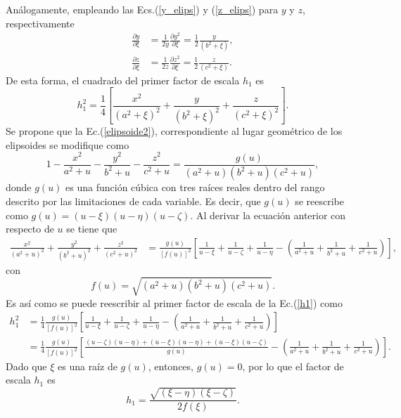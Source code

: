 Análogamente, empleando las Ecs.(\ref{y_elips}) y (\ref{z_elips}) para $y$ y $z$, respectivamente
\begin{align*}
	\frac{\partial y}{\partial \xi}&=\frac{1}{2y}\frac{\partial y^2}{\partial\xi}=\frac{1}{2}\frac{y}{(b^2+\xi)},\\
	\frac{\partial z}{\partial \xi}&=\frac{1}{2z}\frac{\partial z^2}{\partial\xi}=\frac{1}{2}\frac{z}{(c^2+\xi)}.
\end{align*}
De esta forma, el cuadrado del primer factor de escala $h_1$ es
\begin{equation}
	h_1^2=\frac{1}{4}\left[\frac{x^2}{(a^2+\xi)^2}+\frac{y}{(b^2+\xi)^2}+\frac{z}{(c^2+\xi)^2}\right].
	\label{h1}
\end{equation}
Se propone que la Ec.(\ref{elipsoide2}), correspondiente al lugar geométrico de los elipsoides se modifique como
\begin{equation}
	1-\frac{x^2}{a^2+u}-\frac{y^2}{b^2+u}-\frac{z^2}{c^2+u}=\frac{g(u)}{(a^2+u)(b^2+u)(c^2+u)},
\end{equation}
donde $g(u)$ es una función cúbica con tres raíces reales dentro del rango descrito por las limitaciones de cada variable. Es decir, que $g(u)$ se reescribe como $g(u)=(u-\xi)(u-\eta)(u-\zeta)$. Al derivar la ecuación anterior con respecto de $u$ se tiene que
\begin{align}
	\frac{x^2}{(a^2+u)^2}+\frac{y^2}{(b^2+u)^2}+\frac{z^2}{(c^2+u)^2}&=\frac{g(u)}{[f(u)]^2}\left[\frac{1}{u-\xi}+\frac{1}{u-\zeta}+\frac{1}{u-\eta}-\left(\frac{1}{a^2+u}+\frac{1}{b^2+u}+\frac{1}{c^2+u}\right)\right],
\end{align}
con 
\begin{equation}
	f(u)=\sqrt{(a^2+u)(b^2+u)(c^2+u)}.    
\end{equation}
Es así como se puede reescribir al primer factor de escala de la Ec.(\ref{h1}) como
\begin{align*}
	h_1^2&=\frac{1}{4}\frac{g(u)}{[f(u)]^2}\left[\frac{1}{u-\xi}+\frac{1}{u-\zeta}+\frac{1}{u-\eta}-\left(\frac{1}{a^2+u}+\frac{1}{b^2+u}+\frac{1}{c^2+u}\right)\right]\nonumber\\
	&=\frac{1}{4}\frac{g(u)}{[f(u)]^2}\left[\frac{(u-\zeta)(u-\eta)+(u-\xi)(u-\eta)+(u-\xi)(u-\zeta)}{g(u)}-\left(\frac{1}{a^2+u}+\frac{1}{b^2+u}+\frac{1}{c^2+u}\right)\right].    
\end{align*}
Dado que $\xi$ es una raíz de $g(u)$, entonces, $g(u)=0$, por lo que el factor de escala $h_1$ es
\begin{equation}
	h_1=\frac{\sqrt{(\xi-\eta)(\xi-\zeta)}}{2f(\xi)}.
\end{equation}
